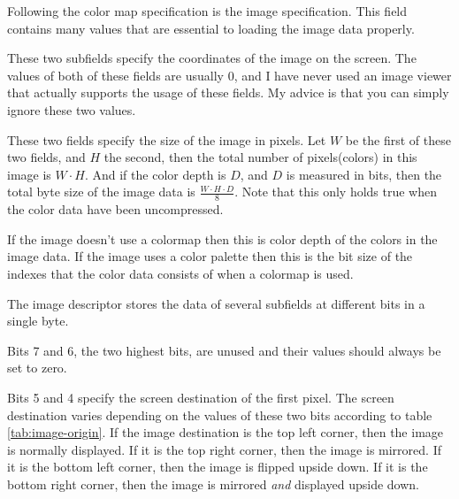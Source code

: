 
Following the color map specification is the image specification. This
field contains many values that are essential to loading the image data
properly.



These two subfields specify the coordinates of the image on the
screen. The values of both of these fields are usually $0$, and I have
never used an image viewer that actually supports the usage of these
fields. My advice is that you can simply ignore these two values.



These two fields specify the size of the image in pixels. Let $W$ be
the first of these two fields, and $H$ the second, then the total
number of pixels(colors) in this image is $W \cdot H$. And if the
color depth is $D$, and $D$ is measured in bits, then the total byte
size of the image data is $\frac{W \cdot H \cdot D}{8}$. Note that
this only holds true when the color data have been uncompressed.


If the image doesn't use a colormap then this is color depth of the
colors in the image data. If the image uses a color palette then this
is the bit size of the indexes that the color data consists of when a
colormap is used.


The image descriptor stores the data of several subfields at different
bits in a single byte.

Bits 7 and 6, the two highest bits, are unused and their values should
always be set to zero.

Bits 5 and 4 specify the screen destination of the first pixel. The
screen destination varies depending on the values of these two bits
according to table \ref{tab:image-origin}. If the image destination is
the top left corner, then the image is normally displayed. If it is
the top right corner, then the image is mirrored. If it is the bottom
left corner, then the image is flipped upside down. If it is the
bottom right corner, then the image is mirrored \textit{and} displayed
upside down.

